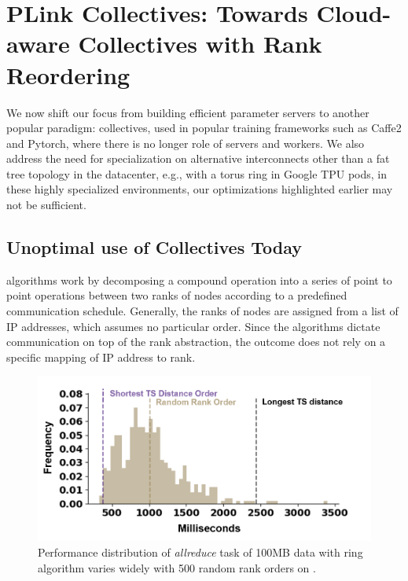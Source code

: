 \chapter{PLink Collectives: Towards Cloud-aware Collectives with Rank Reordering}
We now shift our focus from building efficient parameter servers to another popular paradigm: collectives, used in popular training frameworks such as Caffe2 and Pytorch, where there is no longer role of servers and workers. We also address the need for specialization on alternative interconnects other than a fat tree topology in the datacenter, e.g., with a torus ring in Google TPU pods, in these highly specialized environments, our optimizations highlighted earlier may not be sufficient. 


\section{Unoptimal use of Collectives Today}
\mpi algorithms work by decomposing a compound operation into a series of point to point operations between two ranks of nodes according to a predefined communication schedule. Generally, the ranks of nodes are assigned from a list of IP addresses, which assumes no particular order. Since the \mpi algorithms dictate communication on top of the rank abstraction, the outcome does not rely on a specific mapping of IP address to rank.

\begin{figure}[h!]
	\centering
	\includegraphics[width=.5\linewidth, trim=8 3 14 14,clip]{Figures/azringperformance.png}
	\caption{Performance distribution of \textit{allreduce} task of 100MB data with ring algorithm varies widely with 500 random rank orders on \azure.}
	\label{fig:azringperformance}
\end{figure}

